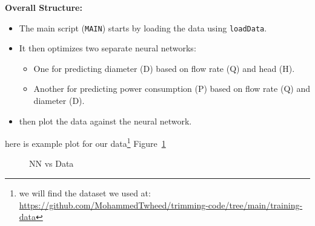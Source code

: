 \documentclass[
  super,
  review,
  3p]{elsarticle}
\providecommand{\tightlist}{%
  \setlength{\itemsep}{0pt}\setlength{\parskip}{0pt}}\usepackage{longtable,booktabs,array}
\begin{document}
\textbf{Overall Structure:}

\begin{itemize}
\tightlist
\item
  The main script (\texttt{MAIN}) starts by loading the data using
  \texttt{loadData}.
\item
  It then optimizes two separate neural networks:

  \begin{itemize}
  \tightlist
  \item
    One for predicting diameter (D) based on flow rate (Q) and head (H).
  \item
    Another for predicting power consumption (P) based on flow rate (Q)
    and diameter (D).
  \end{itemize}
\item
  then plot the data against the neural network.
\end{itemize}

here is example plot for our data\footnote{we will find the dataset we
  used at:
  \url{https://github.com/MohammedTwheed/trimming-code/tree/main/training-data}}
Figure~\ref{fig-NNvsData}

\begin{figure}


\caption{\label{fig-NNvsData}NN vs Data}

\end{figure}%


  


\nocite{*}
\end{document}
